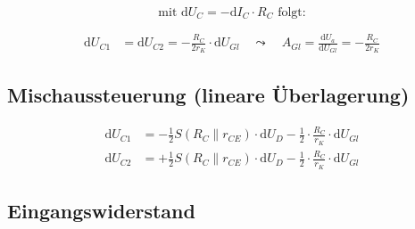 \[
\text{mit } \mathrm{d}U_C = -\mathrm{d}I_C \cdot R_C \text{ folgt:}
\]

\begin{align*}
\mathrm{d}U_{C1} &= \mathrm{d}U_{C2} = -\frac{R_C}{2 r_K} \cdot \mathrm{d}U_{Gl} \quad \leadsto
\quad A_{Gl} =
\frac{\mathrm{d}U_a}{\mathrm{d}U_{Gl}} = -\frac{R_C}{2 r_K}
\end{align*}

\subsection*{Mischaussteuerung (lineare Überlagerung)}

\begin{align*}
	\mathrm{d}U_{C1} &= -\frac{1}{2}S\left( R_C \parallel r_{CE} \right) \cdot \mathrm{d}U_D
	-\frac{1}{2} \cdot \frac{R_C}{r_K} \cdot \mathrm{d}U_{Gl}
	\\
	\mathrm{d}U_{C2} &= +\frac{1}{2}S\left( R_C \parallel r_{CE} \right) \cdot \mathrm{d}U_D
	-\frac{1}{2} \cdot \frac{R_C}{r_K} \cdot \mathrm{d}U_{Gl}
\end{align*}


\subsection*{Eingangswiderstand}

	\begin{center}
		
	\end{center}